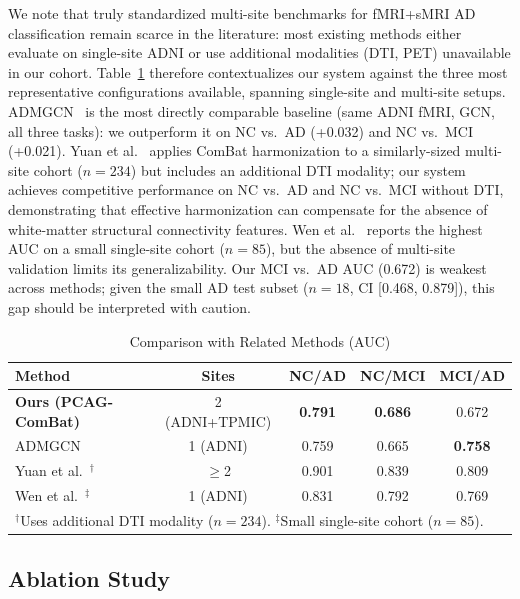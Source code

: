 \documentclass[conference]{IEEEtran}
\begin{document}
We note that truly standardized multi-site benchmarks for fMRI+sMRI AD classification remain scarce in the literature: most existing methods either evaluate on single-site ADNI or use additional modalities (DTI, PET) unavailable in our cohort. Table~\ref{tab:benchmark} therefore contextualizes our system against the three most representative configurations available, spanning single-site and multi-site setups. ADMGCN~\cite{sun2025admgcn} is the most directly comparable baseline (same ADNI fMRI, GCN, all three tasks): we outperform it on NC vs.\ AD (+0.032) and NC vs.\ MCI (+0.021). Yuan et al.~\cite{yuan2026multimodal} applies ComBat harmonization to a similarly-sized multi-site cohort ($n{=}234$) but includes an additional DTI modality; our system achieves competitive performance on NC vs.\ AD and NC vs.\ MCI without DTI, demonstrating that effective harmonization can compensate for the absence of white-matter structural connectivity features. Wen et al.~\cite{wen2025stdfbn} reports the highest AUC on a small single-site cohort ($n{=}85$), but the absence of multi-site validation limits its generalizability. Our MCI vs.\ AD AUC (0.672) is weakest across methods; given the small AD test subset ($n{=}18$, CI [0.468, 0.879]), this gap should be interpreted with caution.

\begin{table}[h]
\caption{Comparison with Related Methods (AUC)}
\label{tab:benchmark}
\centering
\begin{tabular}{lcccc}
\toprule
Method & Sites & NC/AD & NC/MCI & MCI/AD \\
\midrule
\textbf{Ours (PCAG-ComBat)}        & 2 (ADNI+TPMIC) & \textbf{0.791} & \textbf{0.686} & 0.672 \\
ADMGCN \cite{sun2025admgcn}        & 1 (ADNI)       & 0.759 & 0.665 & \textbf{0.758} \\
Yuan et al.~\cite{yuan2026multimodal}$^{\dag}$ & $\geq$2        & 0.901 & 0.839 & 0.809 \\
Wen et al.~\cite{wen2025stdfbn}$^{\ddag}$     & 1 (ADNI)       & 0.831 & 0.792 & 0.769 \\
\bottomrule
\multicolumn{5}{l}{\small $^{\dag}$Uses additional DTI modality ($n{=}234$). $^{\ddag}$Small single-site cohort ($n{=}85$).}
\end{tabular}
\end{table}

\subsection{Ablation Study}
\end{document}
